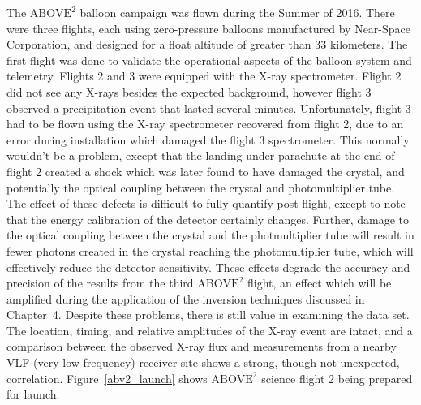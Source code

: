 The $\text{ABOVE}^2$ balloon campaign was flown during the Summer of 2016. There were three flights, each using zero-pressure balloons manufactured by Near-Space Corporation, and designed for a float altitude of greater than 33 kilometers. The first flight was done to validate the operational aspects of the balloon system and telemetry. Flights 2 and 3 were equipped with the X-ray spectrometer. Flight 2 did not see any X-rays besides the expected background, however flight 3 observed a precipitation event that lasted several minutes. Unfortunately, flight 3 had to be flown using the X-ray spectrometer recovered from flight 2, due to an error during installation which damaged the flight 3 spectrometer. This normally wouldn't be a problem, except that the landing under parachute at the end of flight 2 created a shock which was later found to have damaged the crystal, and potentially the optical coupling between the crystal and photomultiplier tube. The effect of these defects is difficult to fully quantify post-flight, except to note that the energy calibration of the detector certainly changes. Further, damage to the optical coupling between the crystal and the photmultiplier tube will result in fewer photons created in the crystal reaching the photomultiplier tube, which will effectively reduce the detector sensitivity. These effects degrade the accuracy and precision of the results from the third $\text{ABOVE}^2$ flight, an effect which will be amplified during the application of the inversion techniques discussed in Chapter~4. Despite these problems, there is still value in examining the data set. The location, timing, and relative amplitudes of the X-ray event are intact, and a comparison between the observed X-ray flux and measurements from a nearby VLF (very low frequency) receiver site shows a strong, though not unexpected, correlation. Figure~\ref{abv2_launch} shows $\text{ABOVE}^2$ science flight 2 being prepared for launch. 

